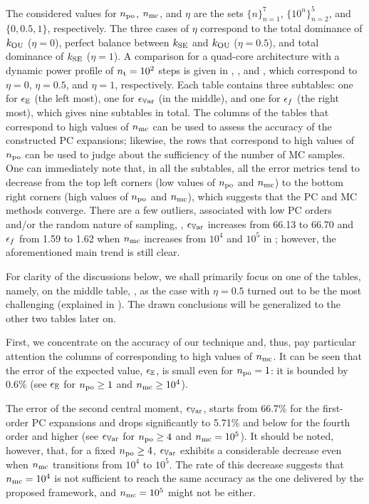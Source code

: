 The considered values for ${n_\text{po}}$, ${n_\text{mc}}$, and $\eta$ are the sets $\{ n \}_{n = 1}^7$, $\{ 10^n \}_{n = 2}^5$, and $\{ 0, 0.5, 1 \}$, respectively.
The three cases of $\eta$ correspond to the total dominance of $k_{\text{OU}}$ ($\eta = 0$), perfect balance between $k_{\text{SE}}$ and $k_{\text{OU}}$ ($\eta = 0.5$), and total dominance of $k_{\text{SE}}$ ($\eta = 1$).
A comparison for a quad-core architecture with a dynamic power profile of ${n_\text{t}} = 10^2$ steps is given in , , and , which correspond to $\eta = 0$, $\eta = 0.5$, and $\eta = 1$, respectively.
Each table contains three subtables: one for $\epsilon_\mathbb{E}$ (the left most), one for $\epsilon_{\mathbb{V}\text{ar}}$ (in the middle), and one for $\epsilon_f$ (the right most), which gives nine subtables in total.
The columns of the tables that correspond to high values of ${n_\text{mc}}$ can be used to assess the accuracy of the constructed PC expansions; likewise, the rows that correspond to high values of ${n_\text{po}}$ can be used to judge about the sufficiency of the number of MC samples.
One can immediately note that, in all the subtables, all the error metrics tend to decrease from the top left corners (low values of ${n_\text{po}}$ and ${n_\text{mc}}$) to the bottom right corners (high values of ${n_\text{po}}$ and ${n_\text{mc}}$), which suggests that the PC and MC methods converge.
There are a few outliers, associated with low PC orders and/or the random nature of sampling, \eg, $\epsilon_{\mathbb{V}\text{ar}}$ increases from 66.13 to 66.70 and $\epsilon_f$ from 1.59 to 1.62 when ${n_\text{mc}}$ increases from $10^4$ and $10^5$ in ; however, the aforementioned main trend is still clear.

For clarity of the discussions below, we shall primarily focus on one of the tables, namely, on the middle table, , as the case with $\eta = 0.5$ turned out to be the most challenging (explained in ).
The drawn conclusions will be generalized to the other two tables later on.



First, we concentrate on the accuracy of our technique and, thus, pay particular attention the columns of  corresponding to high values of ${n_\text{mc}}$.
It can be seen that the error of the expected value, $\epsilon_\mathbb{E}$, is small even for ${n_\text{po}} = 1$: it is bounded by 0.6\% (see $\epsilon_\mathbb{E}$ for ${n_\text{po}} \geq 1$ and ${n_\text{mc}} \geq 10^4$).

The error of the second central moment, $\epsilon_{\mathbb{V}\text{ar}}$, starts from 66.7\% for the first-order PC expansions and drops significantly to 5.71\% and below for the fourth order and higher (see $\epsilon_{\mathbb{V}\text{ar}}$ for ${n_\text{po}} \geq 4$ and ${n_\text{mc}} = 10^5$).
It should be noted, however, that, for a fixed ${n_\text{po}} \geq 4$, $\epsilon_{\mathbb{V}\text{ar}}$ exhibits a considerable decrease even when ${n_\text{mc}}$ transitions from $10^4$ to $10^5$.
The rate of this decrease suggests that ${n_\text{mc}} = 10^4$ is not sufficient to reach the same accuracy as the one delivered by the proposed framework, and ${n_\text{mc}} = 10^5$ might not be either.

